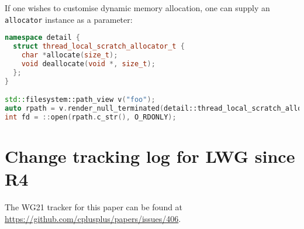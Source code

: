 \documentclass[11pt]{article}
\newcommand{\code}[2][cpp]{\lstinline[language=#1,basicstyle=\small\ttfamily]{#2}}
\begin{document}
\begin{itemize}
    If one wishes to customise dynamic memory allocation, one can supply an \code{allocator} instance as a parameter:

    \begin{lstlisting}[language=cpp]
namespace detail {
  struct thread_local_scratch_allocator_t {
    char *allocate(size_t);
    void deallocate(void *, size_t);
  };
}

std::filesystem::path_view v("foo");
auto rpath = v.render_null_terminated(detail::thread_local_scratch_allocator_t{});
int fd = ::open(rpath.c_str(), O_RDONLY);
    \end{lstlisting}
\end{itemize}

\section{Change tracking log for LWG since R4}

The WG21 tracker for this paper can be found at \url{https://github.com/cplusplus/papers/issues/406}.
\end{document}

